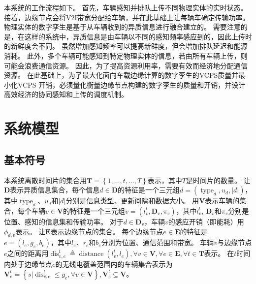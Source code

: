 本系统的工作流程如下。
首先，车辆感知并排队上传不同物理实体的实时状态。
接着，边缘节点会将V2I带宽分配给车辆，并在此基础上让每辆车确定传输功率。
物理实体的数字孪生是基于从车辆收到的异质信息进行融合建立的。
需要注意的是，在这样的系统中，异质信息是由车辆以不同的感知频率感应到的，因此上传时的新鲜度会不同。
虽然增加感知频率可以提高新鲜度，但会增加排队延迟和能源消耗。
此外，多个车辆可能感知到特定物理实体的信息，若由所有车辆上传，则可能会浪费通信资源。
因此，为了提高资源利用率，需要有效而经济地分配通信资源。
在此基础上，为了最大化面向车载边缘计算的数字孪生的VCPS质量并最小化VCPS 开销，必须量化衡量边缘节点构建的数字孪生的质量和开销，并设计高效经济的协同感知和上传的调度机制。

\section{系统模型}\label{section 5-3}
\subsection{基本符号}
本系统离散时间片的集合用$\mathbf{T}=\left\{1,\ldots,t,\ldots, T \right\}$表示，其中$T$是时间片的数量。
让$\mathbf{D}$表示异质信息集合，每个信息$d \in \mathbf{D}$的特征是一个三元组$d=\left(\operatorname{type}_d, u_d, \left|d\right| \right)$，其中$\operatorname{type}_d$、$u_d$和$\left|d\right|$分别是信息类型、更新间隔和数据大小。
用$\mathbf{V}$表示车辆的集合，每个车辆$v\in \mathbf{V}$的特征是一个三元组$v=\left (l_v^t, \mathbf{D}_v, \pi_v \right )$，其中$l_v^t$, $\mathbf{D}_v$和$\pi_v$分别是位置、感知的信息集和传输功率。
对于$d \in \mathbf{D}_v$，车辆$v$的感应开销（即能耗）用$\phi_{d, v}$表示。
让$\mathbf{E}$表示边缘节点的集合。
每个边缘节点$e \in \mathbf{E}$的特征是$e=\left (l_e, g_e, b_e \right)$，其中$l_{e}$、$r_{e}$和$b_{e}$分别为位置、通信范围和带宽。
车辆$v$与边缘节点$e$之间的距离用$\operatorname{dis}_{v, e}^t \triangleq \operatorname{distance} \left (l_v^t, l_e \right ), \forall v \in \mathbf{V}, \forall e \in \mathbf{E}, \forall t \in \mathbf{T}$表示。
在$t$时间内处于边缘节点$e$的无线电覆盖范围内的车辆集合表示为$\mathbf{V}_e^t=\left \{s \vert \operatorname{dis}_{v, e}^t \leq g_e, \forall v \in \mathbf{V} \right \}, \mathbf{V}_e^t \subseteq \mathbf{V}$。

